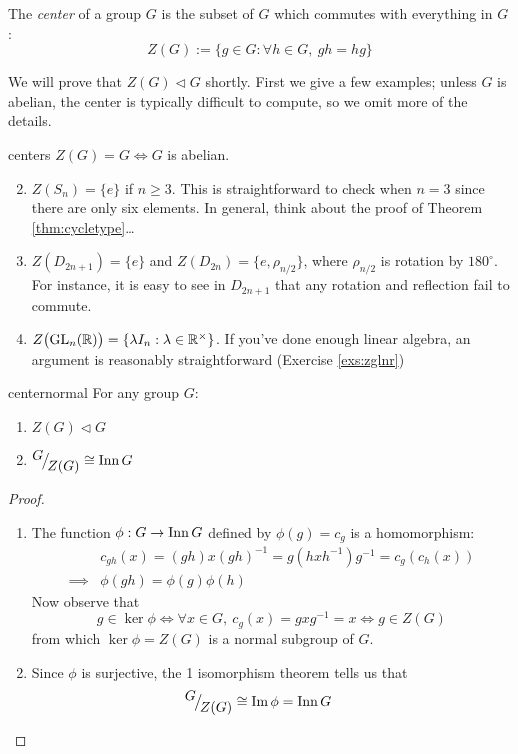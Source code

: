 \begin{defn}{}{}
The \emph{center} of a group $G$ is the subset of $G$ which commutes with everything in $G$:
\[Z(G):=\{g\in G:\forall h\in G,\ gh=hg\}\]
\end{defn}

We will prove that $Z(G)\triangleleft G$ shortly. First we give a few examples; unless $G$ is abelian, the center is typically difficult to compute, so we omit more of the details.


\begin{examples}{}{centers}
\exstart $Z(G)=G\iff G$ is abelian.
\begin{enumerate}\setcounter{enumi}{1}
  \item $Z(S_n)=\{e\}$ if $n\ge 3$. This is straightforward to check when $n=3$ since there are only six elements. In general, think about the proof of Theorem \ref{thm:cycletype}\ldots
  \item $Z(D_{2n+1})=\{e\}$ and $Z(D_{2n})=\{e,\rho_{n/2}\}$, where $\rho_{n/2}$ is rotation by $180^\circ$. For instance, it is easy to see in $D_{2n+1}$ that any rotation and reflection fail to commute.
  \item $Z\bigl(\mathrm{GL}_n(\mathbb{R})\bigr)=\{\lambda I_n:\lambda\in\mathbb{R}^\times\}$. If you've done enough linear algebra, an argument is reasonably straightforward (Exercise \ref{exs:zglnr})
\end{enumerate}
\end{examples}

\begin{thm}{}{centernormal}
For any group $G$:
\begin{enumerate}
  \item $Z(G)\triangleleft G$
  \item ${}^{\textstyle {G}}\!\big/_{\textstyle \!{Z(G)}}\cong \operatorname{Inn} G$
\end{enumerate}
\end{thm}

\begin{proof}
\begin{enumerate}
  \item The function $\phi:G\to\operatorname{Inn} G$ defined by $\phi(g)=c_g$ is a homomorphism:
	\begin{align*}
		&c_{gh}(x)=(gh)x(gh)^{-1}=g(hxh^{-1})g^{-1}=c_g(c_h(x))\\
		\implies &\phi(gh)=\phi(g)\phi(h)
	\end{align*}
	Now observe that
	\[
		g\in\ker\phi\iff \forall x\in G,\ c_g(x)=gxg^{-1}=x\iff g\in Z(G)
	\]
	from which $\ker\phi=Z(G)$ is a normal subgroup of $G$.
	\item Since $\phi$ is surjective, the 1\st{} isomorphism theorem tells us that
\[{}^{\textstyle {G}}\!\big/_{\textstyle \!{Z(G)}}\cong\operatorname{Im}\phi=\operatorname{Inn} G\tag*{\qedhere}\]
\end{enumerate}
\end{proof}

